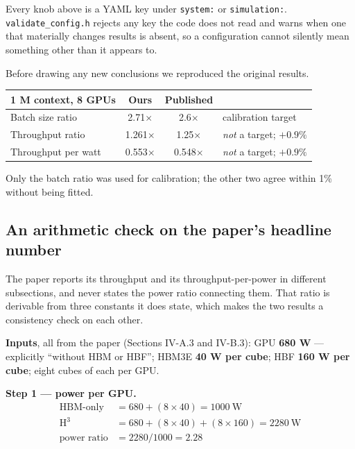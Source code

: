 \documentclass[11pt,a4paper]{article}
\newcommand{\code}[1]{\texttt{#1}}
\begin{document}
Every knob above is a YAML key under \code{system:} or \code{simulation:}.
\code{validate\_config.h} rejects any key the code does not read and warns when
one that materially changes results is absent, so a configuration cannot
silently mean something other than it appears to.

Before drawing any new conclusions we reproduced the original results.

\begin{table}[h]
\centering\small
\begin{tabular}{@{}lccl@{}}
\toprule
\textbf{1 M context, 8 GPUs} & \textbf{Ours} & \textbf{Published} & \\
\midrule
Batch size ratio    & 2.71$\times$  & 2.6$\times$   & calibration target \\
Throughput ratio    & 1.261$\times$ & 1.25$\times$  & \emph{not} a target; $+0.9\%$ \\
Throughput per watt & 0.553$\times$ & 0.548$\times$ & \emph{not} a target; $+0.9\%$ \\
\bottomrule
\end{tabular}
\end{table}

Only the batch ratio was used for calibration; the other two agree within 1\%
without being fitted.

\subsection{An arithmetic check on the paper's headline number}

The paper reports its throughput and its throughput-per-power in different
subsections, and never states the power ratio connecting them. That ratio is
derivable from three constants it does state, which makes the two results a
consistency check on each other.

\textbf{Inputs}, all from the paper (Sections IV-A.3 and IV-B.3): GPU
\textbf{680 W} --- explicitly ``without HBM or HBF''; HBM3E \textbf{40 W per
cube}; HBF \textbf{160 W per cube}; eight cubes of each per GPU.

\textbf{Step 1 --- power per GPU.}
\begin{align*}
  \text{HBM-only} &= 680 + (8 \times 40) = 1000\ \text{W} \\
  \text{H}^3      &= 680 + (8 \times 40) + (8 \times 160) = 2280\ \text{W} \\[2pt]
  \text{power ratio} &= 2280 / 1000 = 2.28
\end{align*}
\end{document}
